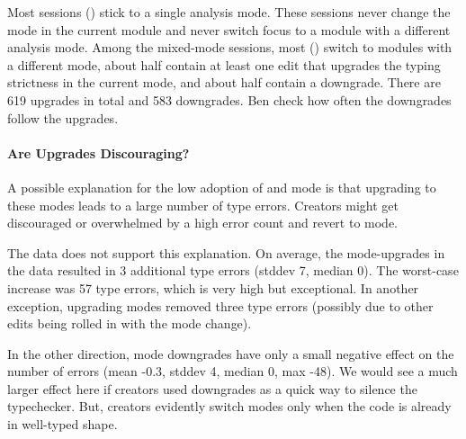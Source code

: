 \documentclass[english,submission,cleveref]{programming}
\begin{document}
Most sessions () stick to a single analysis mode.
These sessions never change the mode in the current module and never switch
focus to a module with a different analysis mode.
Among the mixed-mode sessions, most () switch to modules with
a different mode, about half contain at least one edit that upgrades
the typing strictness in the
current mode, and about half contain a downgrade.
There are 619 upgrades in total and 583 downgrades.
\FILL{} Ben check how often the downgrades follow the upgrades.


\paragraph{Are Upgrades Discouraging?}


A possible explanation for the low adoption of \mnonstrict{} and
\mstrict{} mode is that upgrading to these modes leads to a large
number of type errors.
Creators might get discouraged or overwhelmed by a high error count and revert to
\mnocheck{} mode.

The data does not support this explanation.
On average, the mode-upgrades in the data resulted in 3 additional
type errors (stddev 7, median 0).
The worst-case increase was 57 type errors, which is very high
but exceptional.
In another exception, upgrading modes removed three type errors
(possibly due to other edits being rolled in with the
mode change).

In the other direction, mode downgrades have only a small negative effect on the
number of errors (mean -0.3, stddev 4, median 0, max -48).
We would see a much larger effect here if creators used downgrades
as a quick way to silence the typechecker.
But, creators evidently switch modes only when the code is already
in well-typed shape.


\end{document}

